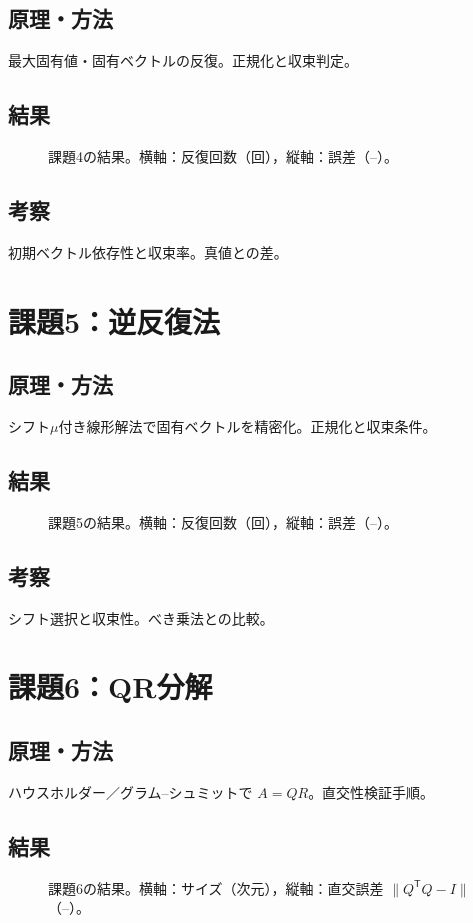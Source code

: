 \documentclass[a4paper,11pt]{ltjsarticle}
\begin{document}
\subsection{原理・方法}
最大固有値・固有ベクトルの反復。正規化と収束判定。
\subsection{結果}
\begin{figure}[H]
  \centering
  \caption{課題4の結果。横軸：反復回数（回），縦軸：誤差（–）。}
  \label{fig:t4}
\end{figure}
\subsection{考察}
初期ベクトル依存性と収束率。真値との差。

\section{課題5：逆反復法}
\subsection{原理・方法}
シフト$\mu$付き線形解法で固有ベクトルを精密化。正規化と収束条件。
\subsection{結果}
\begin{figure}[H]
  \centering
  \caption{課題5の結果。横軸：反復回数（回），縦軸：誤差（–）。}
  \label{fig:t5}
\end{figure}
\subsection{考察}
シフト選択と収束性。べき乗法との比較。

\section{課題6：QR分解}
\subsection{原理・方法}
ハウスホルダー／グラム–シュミットで $A=QR$。直交性検証手順。
\subsection{結果}
\begin{figure}[H]
  \centering
  \caption{課題6の結果。横軸：サイズ（次元），縦軸：直交誤差 $\lVert Q^\mathsf{T}Q-I\rVert$（–）。}
  \label{fig:t6}
\end{figure}
\end{document}
